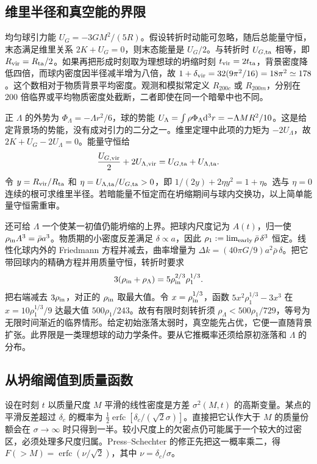 \subsection{维里半径和真空能的界限}

均匀球引力能 $U_G=-3GM^2/(5R)$。假设转折时动能可忽略，随后总能量守恒，末态满足维里关系 $2K+U_G=0$，则末态能量是 $U_G/2$。与转折时 $U_{G,\rm ta}$ 相等，即 $R_{\rm vir}=R_{\rm ta}/2$。如果再把形成时刻取为理想球的坍缩时刻 $t_{\rm vir}=2t_{\rm ta}$，背景密度降低四倍，而球内密度因半径减半增为八倍，故 $1+\delta_{\rm vir}=32(9\pi^2/16)=18\pi^2\simeq178$。这个数相对于物质背景平均密度。观测和模拟常定义 $R_{200c}$ 或 $R_{200m}$，分别在 $200$ 倍临界或平均物质密度处截断，二者即使在同一个暗晕中也不同。

正 $\Lambda$ 的外势为 $\Phi_\Lambda=-\Lambda r^2/6$，球的势能 $U_\Lambda=\int\rho\Phi_\Lambda\dd^3r=-\Lambda MR^2/10$。这是给定背景场的势能，没有成对引力的二分之一。维里定理中此项的力矩为 $-2U_\Lambda$，故 $2K+U_G-2U_\Lambda=0$。能量守恒给
\[
 \frac{U_{G,\rm vir}}2+2U_{\Lambda,\rm vir}
        =U_{G,\rm ta}+U_{\Lambda,\rm ta}.
\]
令 $y=R_{\rm vir}/R_{\rm ta}$ 和 $\eta=U_{\Lambda,\rm ta}/U_{G,\rm ta}>0$，即 $1/(2y)+2\eta y^2=1+\eta$。选与 $\eta=0$ 连续的根可求维里半径。若暗能量不恒定而在坍缩期间与球内交换功，以上简单能量守恒需重审。

还可给 $\Lambda$ 一个使某一初值仍能坍缩的上界。把球内尺度记为 $A(t)$，归一使 $\rho_{\rm in}A^3=\bar\rho a^3$。物质期的小密度反差满足 $\delta\propto a$，因此 $\rho_1:=\lim_{\rm early}\bar\rho\,\delta^3$ 恒定。线性化球内外的 Friedmann 方程并减去，曲率增量为 $\Delta k=(40\pi G/9)a^2\bar\rho\,\delta$。把它带回球内的精确方程并用质量守恒，转折时要求
\[
 3(\rho_{\rm in}+\rho_\Lambda)=5\rho_{\rm in}^{2/3}\rho_1^{1/3}.
\]
把右端减去 $3\rho_{\rm in}$，对正的 $\rho_{\rm in}$ 取最大值。令 $x=\rho_{\rm in}^{1/3}$，函数 $5x^2\rho_1^{1/3}-3x^3$ 在 $x=10\rho_1^{1/3}/9$ 达最大值 $500\rho_1/243$。故有有限时刻转折须 $\rho_\Lambda<500\rho_1/729$，等号为无限时间渐近的临界情形。给定初始涨落太弱时，真空能先占优，它便一直随背景扩张。此界限是一类理想球的动力学条件。要从它推概率还须给原初涨落和 $\Lambda$ 的分布。

\subsection{从坍缩阈值到质量函数}

设在时刻 $t$ 以质量尺度 $M$ 平滑的线性密度是方差 $\sigma^2(M,t)$ 的高斯变量。某点的平滑反差超过 $\delta_c$ 的概率为 $\frac12\operatorname{erfc}[\delta_c/(\sqrt2\sigma)]$。直接把它认作大于 $M$ 的质量份额会在 $\sigma\to\infty$ 时只得到一半。较小尺度上的欠密点仍可能属于一个较大的过密区，必须处理多尺度归属。Press--Schechter 的修正先把这一概率乘二，得 $F(>M)=\operatorname{erfc}(\nu/\sqrt2)$，其中 $\nu=\delta_c/\sigma$。

